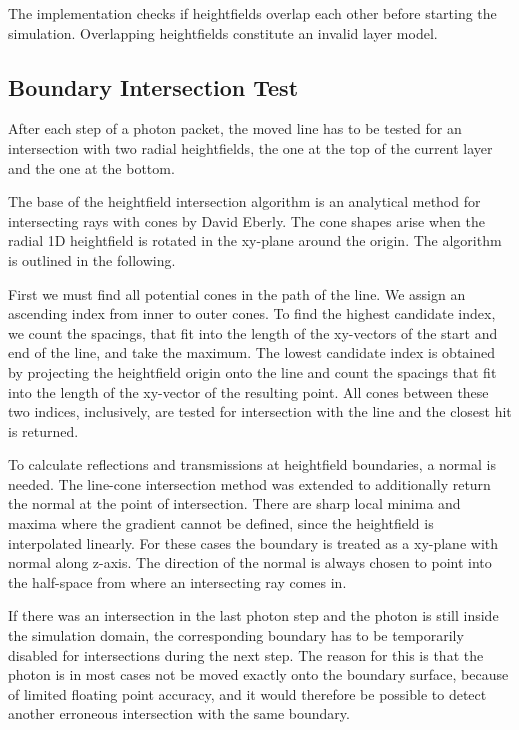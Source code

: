 \documentclass[]{article}
\begin{document}
The implementation checks if heightfields overlap each other before starting the simulation. Overlapping heightfields constitute an invalid layer model.

\subsection{Boundary Intersection Test}
\label{impl:intersection}

After each step of a photon packet, the moved line has to be tested for an intersection with two radial heightfields, the one at the top of the current layer and the one at the bottom.

The base of the heightfield intersection algorithm is an analytical method for intersecting rays with cones by David Eberly\cite{schneider2002geometric}. The cone shapes arise when the radial 1D heightfield is rotated in the xy-plane around the origin. The algorithm is outlined in the following.

First we must find all potential cones in the path of the line. We assign an ascending index from inner to outer cones. To find the highest candidate index, we count the spacings, that fit into the length of the xy-vectors of the start and end of the line, and take the maximum. The lowest candidate index is obtained by projecting the heightfield origin onto the line and count the spacings that fit into the length of the xy-vector of the resulting point. All cones between these two indices, inclusively, are tested for intersection with the line and the closest hit is returned.

To calculate reflections and transmissions at heightfield boundaries, a normal is needed. The line-cone intersection method was extended to additionally return the normal at the point of intersection. There are sharp local minima and maxima where the gradient cannot be defined, since the heightfield is interpolated linearly. For these cases the boundary is treated as a xy-plane with normal along z-axis. The direction of the normal is always chosen to point into the half-space from where an intersecting ray comes in.

If there was an intersection in the last photon step and the photon is still inside the simulation domain, the corresponding boundary has to be temporarily disabled for intersections during the next step. The reason for this is that the photon is in most cases not be moved exactly onto the boundary surface, because of limited floating point accuracy, and it would therefore be possible to detect another erroneous intersection with the same boundary.
\end{document}
